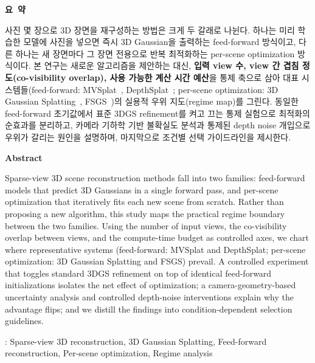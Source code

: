 \vspace{1.2em}
\begin{center}{\bfseries 요\ 약}\end{center}
\noindent 사진 몇 장으로 3D 장면을 재구성하는 방법은 크게 두 갈래로 나뉜다. 하나는 미리 학습한 모델에 사진을 넣으면 즉시 3D Gaussian을 출력하는 feed-forward 방식이고, 다른 하나는 새 장면마다 그 장면 전용으로 반복 최적화하는 per-scene optimization 방식이다. 본 연구는 새로운 알고리즘을 제안하는 대신, \textbf{입력 view 수, view 간 겹침 정도(co-visibility overlap), 사용 가능한 계산 시간 예산}을 통제 축으로 삼아 대표 시스템들(feed-forward: MVSplat~\cite{chen2024mvsplat}, DepthSplat~\cite{xu2025depthsplat}; per-scene optimization: 3D Gaussian Splatting~\cite{kerbl20233d}, FSGS~\cite{zhu2024fsgs})의 실용적 우위 지도(regime map)를 그린다. 동일한 feed-forward 초기값에서 표준 3DGS refinement를 켜고 끄는 통제 실험으로 최적화의 순효과를 분리하고, 카메라 기하학 기반 불확실도 분석과 통제된 depth noise 개입으로 우위가 갈리는 원인을 설명하며, 마지막으로 조건별 선택 가이드라인을 제시한다.  

\vspace{1em}
\begin{center}{\bfseries Abstract}\end{center}
\noindent Sparse-view 3D scene reconstruction methods fall into two families: feed-forward models that predict 3D Gaussians in a single forward pass, and per-scene optimization that iteratively fits each new scene from scratch. Rather than proposing a new algorithm, this study maps the practical regime boundary between the two families. Using the number of input views, the co-visibility overlap between views, and the compute-time budget as controlled axes, we chart where representative systems (feed-forward: MVSplat and DepthSplat; per-scene optimization: 3D Gaussian Splatting and FSGS) prevail. A controlled experiment that toggles standard 3DGS refinement on top of identical feed-forward initializations isolates the net effect of optimization; a camera-geometry-based uncertainty analysis and controlled depth-noise interventions explain why the advantage flips; and we distill the findings into condition-dependent selection guidelines. 

\vspace{0.8em}
 : Sparse-view 3D reconstruction, 3D Gaussian Splatting, Feed-forward reconstruction, Per-scene optimization, Regime analysis 

\vspace{0.8em}
\noindent{}
